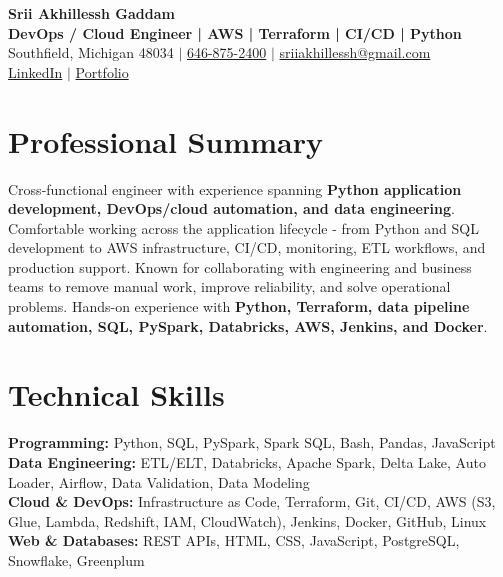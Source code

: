 \documentclass[letterpaper,10pt]{article}
\begin{document}
\fontsize{9.35pt}{10.45pt}\selectfont

\begin{center}
    {\LARGE \textbf{Srii Akhillessh Gaddam}} \\[-1pt]
    \textbf{DevOps / Cloud Engineer | AWS | Terraform | CI/CD | Python} \\[2pt]
    Southfield, Michigan 48034 $|$
    \href{tel:6468752400}{646-875-2400} $|$
    \href{mailto:sriiakhillessh@gmail.com}{sriiakhillessh@gmail.com} \\[1pt]
    \href{https://www.linkedin.com/in/srii-akhiilessh-gaddam-b48668191/}{LinkedIn} $|$
    \href{https://sriiakhillesshg.github.io/portfolio/}{Portfolio}
\end{center}
\vspace{-8pt}

\section{Professional Summary}
\small{Cross-functional engineer with experience spanning \textbf{Python application development, DevOps/cloud automation, and data engineering}. Comfortable working across the application lifecycle - from Python and SQL development to AWS infrastructure, CI/CD, monitoring, ETL workflows, and production support. Known for collaborating with engineering and business teams to remove manual work, improve reliability, and solve operational problems. Hands-on experience with \textbf{Python, Terraform, data pipeline automation, SQL, PySpark, Databricks, AWS, Jenkins, and Docker}.}

\section{Technical Skills}
\small{
\textbf{Programming:} Python, SQL, PySpark, Spark SQL, Bash, Pandas, JavaScript \\
\textbf{Data Engineering:} ETL/ELT, Databricks, Apache Spark, Delta Lake, Auto Loader, Airflow, Data Validation, Data Modeling \\
\textbf{Cloud \& DevOps:} Infrastructure as Code, Terraform, Git, CI/CD, AWS (S3, Glue, Lambda, Redshift, IAM, CloudWatch), Jenkins, Docker, GitHub, Linux \\
\textbf{Web \& Databases:} REST APIs, HTML, CSS, JavaScript, PostgreSQL, Snowflake, Greenplum
}
\end{document}
